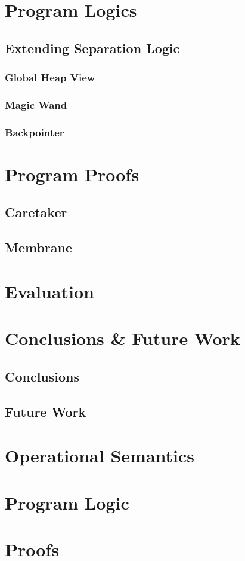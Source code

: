\documentclass[a4paper,notitlepage]{report}
\begin{document}
\chapter{Program Logics}
\section{Extending Separation Logic}
\subsection{Global Heap View}
\subsection{Magic Wand}
\subsection{Backpointer}

\chapter{Program Proofs}
\section{Caretaker}
\section{Membrane}

\chapter{Evaluation}
\chapter{Conclusions \& Future Work}
\section{Conclusions}
\section{Future Work}




\appendix
\chapter{Operational Semantics}
\chapter{Program Logic}
\chapter{Proofs}
\end{document}
